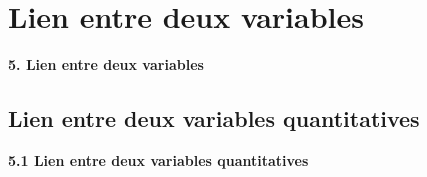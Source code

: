 \documentclass[aspectratio=169,xcolor=dvipsnames]{beamer}
\begin{document}
\section{Lien entre deux variables}

\begin{frame}[plain]

\vfill

\begin{center}
{\huge \textcolor{nyubluedark}{\textbf{5. Lien entre deux variables}}}
\end{center}

\vfill

\end{frame}

\subsection{Lien entre deux variables quantitatives}

\begin{frame}[plain]

\vfill

\begin{center}
{\huge \textcolor{nyubluedark}{\textbf{5.1 Lien entre deux variables quantitatives}}}
\end{center}

\vfill

\end{frame}
\end{document}
